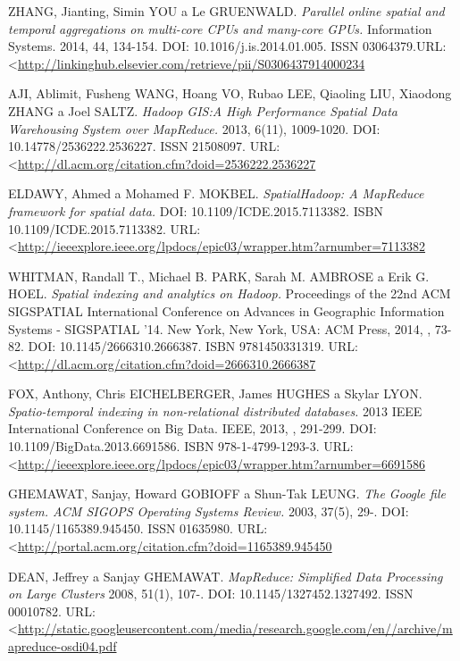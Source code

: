\documentclass[a4paper,12pt,oneside]{report}
\begin{document}
\begin{thebibliography}{99}
ZHANG, Jianting, Simin YOU a Le GRUENWALD. \textit{Parallel online spatial and temporal aggregations on multi-core CPUs and many-core GPUs.} Information Systems. 2014, 44, 134-154. DOI: 10.1016/j.is.2014.01.005. ISSN 03064379.URL:  \textless\url{http://linkinghub.elsevier.com/retrieve/pii/S0306437914000234}


AJI, Ablimit, Fusheng WANG, Hoang VO, Rubao LEE, Qiaoling LIU, Xiaodong ZHANG a Joel SALTZ. \textit{Hadoop GIS:A High Performance Spatial Data Warehousing System over MapReduce.} 2013, 6(11), 1009-1020. DOI: 10.14778/2536222.2536227. ISSN 21508097.  URL:  \textless\url{http://dl.acm.org/citation.cfm?doid=2536222.2536227}

ELDAWY, Ahmed a Mohamed F. MOKBEL. \textit{SpatialHadoop: A MapReduce framework for spatial data.} DOI: 10.1109/ICDE.2015.7113382. ISBN 10.1109/ICDE.2015.7113382. URL:  \textless\url{http://ieeexplore.ieee.org/lpdocs/epic03/wrapper.htm?arnumber=7113382}

WHITMAN, Randall T., Michael B. PARK, Sarah M. AMBROSE a Erik G. HOEL. \textit{Spatial indexing and analytics on Hadoop.} Proceedings of the 22nd ACM SIGSPATIAL International Conference on Advances in Geographic Information Systems - SIGSPATIAL '14. New York, New York, USA: ACM Press, 2014, , 73-82. DOI: 10.1145/2666310.2666387. ISBN 9781450331319. URL:  \textless\url{http://dl.acm.org/citation.cfm?doid=2666310.2666387}

FOX, Anthony, Chris EICHELBERGER, James HUGHES a Skylar LYON. \textit{Spatio-temporal indexing in non-relational distributed databases.} 2013 IEEE International Conference on Big Data. IEEE, 2013, , 291-299. DOI: 10.1109/BigData.2013.6691586. ISBN 978-1-4799-1293-3. URL:  \textless\url{http://ieeexplore.ieee.org/lpdocs/epic03/wrapper.htm?arnumber=6691586}

GHEMAWAT, Sanjay, Howard GOBIOFF a Shun-Tak LEUNG. \textit{The Google file system. ACM SIGOPS Operating Systems Review.} 2003, 37(5), 29-. DOI: 10.1145/1165389.945450. ISSN 01635980.  URL:  \textless\url{http://portal.acm.org/citation.cfm?doid=1165389.945450}

DEAN, Jeffrey a Sanjay GHEMAWAT. \textit{MapReduce: Simplified Data Processing on Large Clusters}  2008, 51(1), 107-. DOI: 10.1145/1327452.1327492. ISSN 00010782. URL:  \textless\url{http://static.googleusercontent.com/media/research.google.com/en//archive/mapreduce-osdi04.pdf}




\end{thebibliography}
\end{document}
